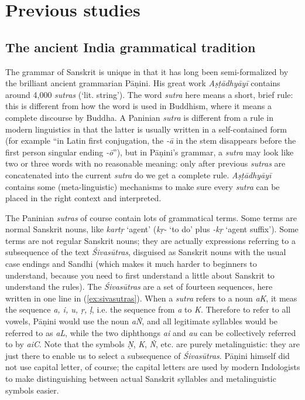 \documentclass[a4paper, oneside, 12pt]{report}
\newcommand{\form}[1]{\emph{#1}}
\newcommand*{\source}[1]{\textit{#1}}
\newcommand{\translate}[1]{`#1'}
\begin{document}
\section{Previous studies}

\subsection{The ancient India grammatical tradition}

The grammar of Sanskrit is unique in that it has long been semi-formalized 
by the brilliant ancient grammarian Pāṇini.
His great work \source{Aṣṭādhyāyī} contains around 4,000 \form{sutras} (\translate{lit. string}).
The word \form{sutra} here means a short, brief rule:
this is different from how the word is used in Buddhism,
where it means a complete discourse by Buddha.
A Paninian \form{sutra} is different from a rule in modern linguistics
in that the latter is usually written in a self-contained form
(for example ``in Latin first conjugation, the \form{-\={a}} in the stem disappears 
before the first person singular ending \form{-\={o}}''),
but in Pāṇini's grammar, a \form{sutra} may look like two or three words with no reasonable meaning:
only after previous \form{sutras} are concatenated into the current \form{sutra} do we get a complete rule.
\source{Aṣṭādhyāyī} contains some (meta-linguistic) mechanisms to make sure
every \form{sutra} can be placed in the right context and interpreted.

The Paninian \form{sutras} of course contain lots of grammatical terms.
Some terms are normal Sanskrit nouns,
like \form{kartṛ} \translate{agent} 
(\form{kṛ-} \translate{to do} plus \form{-kṛ} \translate{agent suffix}).
Some terms are not regular Sanskrit nouns;
they are actually expressions referring to a subsequence of the text \form{Śivasūtras},
disguised as Sanskrit nouns with the usual case endings and Sandhi 
(which makes it much harder to beginners to understand,
because you need to first understand a little about Sanskrit to understand the rules).
The \form{Śivasūtras} are a set of fourteen sequences,
here written in one line in (\ref{ex:sivasutras}).
When a \form{sutra} refers to a noun \form{aK},
it meas the sequence \form{a, i, u, ṛ, ḷ},
i.e. the sequence from \form{a} to \form{K}.
Therefore to refer to all vowels, Pāṇini would use the noun \form{aṄ},
and all legitimate syllables would be referred to as \form{aL},
while the two diphthongs \form{ai} and \form{au} can be collectively referred to by \form{aiC}.
Note that the symbols \form{Ṇ}, \form{K}, \form{Ṅ}, etc.
are purely metalinguistic: 
they are just there to enable us to select a subsequence of \form{Śivasūtras}.
Pāṇini himself did not use capital letter, of course;
the capital letters are used by modern Indologists to make distinguishing between actual Sanskrit syllables and metalinguistic symbols easier.
\end{document}
